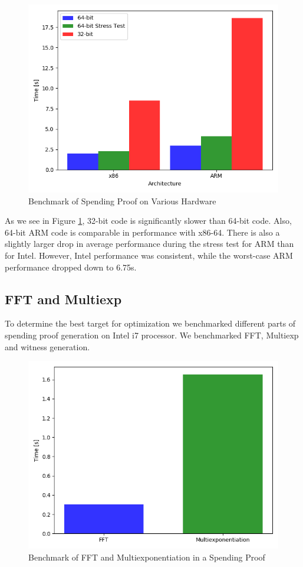 \begin{figure}[h]
    \centering
    \includegraphics[width=.75\linewidth]{Figures/wholeproof.png}
    \caption{Benchmark of Spending Proof on Various Hardware}
    \label{fig:spendingproof}
\end{figure}

\noindent As we see in Figure \ref{fig:spendingproof}, 32-bit code is significantly slower than 64-bit code. Also, 64-bit ARM code is comparable in performance with x86-64. There is also a slightly larger drop in average performance during the stress test for ARM than for Intel. However, Intel performance was consistent, while the worst-case ARM performance dropped down to 6.75s.

\subsection{FFT and Multiexp}

To determine the best target for optimization we benchmarked different parts of spending proof generation on Intel i7 processor. We benchmarked FFT, Multiexp and witness generation.

\begin{figure}[h]
    \centering
    \includegraphics[width=.75\linewidth]{Figures/proofparts.png}
    \caption{Benchmark of FFT and Multiexponentiation in a Spending Proof}
    \label{fig:partsbenchmark}
\end{figure}

